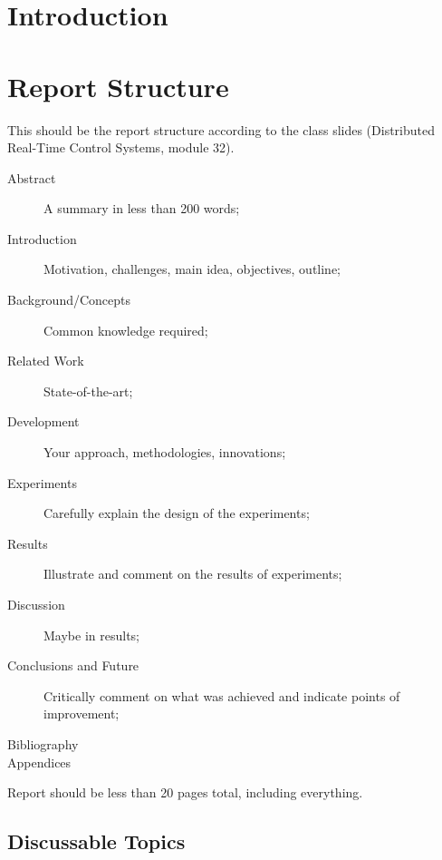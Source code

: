 \documentclass[english,fira]{ist-report}
\begin{document}
\section{Introduction}

\pagebreak
\appendix


\section{Report Structure}

This should be the report structure according to the class slides (Distributed Real-Time Control Systems, module 32).
\begin{description}
	\item[Abstract] A summary in less than 200 words;
	\item[Introduction] Motivation, challenges, main idea, objectives, outline;
	\item[Background/Concepts] Common knowledge required;
	\item[Related Work] State-of-the-art;
	\item[Development] Your approach, methodologies, innovations;
	\item[Experiments] Carefully explain the design of the experiments;
	\item[Results] Illustrate and comment on the results of experiments;
	\item[Discussion] Maybe in results;
	\item[Conclusions and Future] Critically comment on what was achieved and indicate points of improvement;
	\item[Bibliography]
	\item[Appendices]
\end{description}

Report should be less than 20 pages total, including everything.

\subsection{Discussable Topics}
\end{document}
